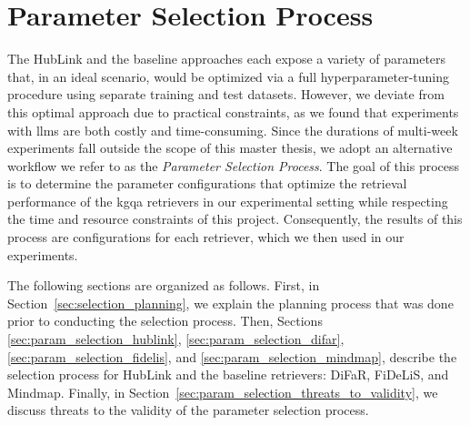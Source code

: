 
\chapter{Parameter Selection Process}
\label{ch:parameter_selection_process}

The HubLink and the baseline approaches each expose a variety of parameters that, in an ideal scenario, would be optimized via a full hyperparameter-tuning procedure using separate training and test datasets. However, we deviate from this optimal approach due to practical constraints, as we found that experiments with \glspl{llm} are both costly and time-consuming. Since the durations of multi-week experiments fall outside the scope of this master thesis, we adopt an alternative workflow we refer to as the \emph{Parameter Selection Process}. The goal of this process is to determine the parameter configurations that optimize the retrieval performance of the \gls{kgqa} retrievers in our experimental setting while respecting the time and resource constraints of this project. Consequently, the results of this process are configurations for each retriever, which we then used in our experiments.

The following sections are organized as follows. First, in Section~\ref{sec:selection_planning}, we explain the planning process that was done prior to conducting the selection process. Then, Sections \ref{sec:param_selection_hublink}, \ref{sec:param_selection_difar}, \ref{sec:param_selection_fidelis}, and \ref{sec:param_selection_mindmap}, describe the selection process for HubLink and the baseline retrievers: DiFaR, FiDeLiS, and Mindmap. Finally, in Section~\ref{sec:param_selection_threats_to_validity}, we discuss threats to the validity of the parameter selection process.








